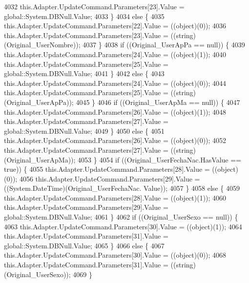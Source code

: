 \begin{DoxyCode}
4032                 this.Adapter.UpdateCommand.Parameters[23].Value = global::System.DBNull.Value;
4033             \}
4034             \textcolor{keywordflow}{else} \{
4035                 this.Adapter.UpdateCommand.Parameters[22].Value = ((object)(0));
4036                 this.Adapter.UpdateCommand.Parameters[23].Value = ((string)(Original\_UserNombre));
4037             \}
4038             \textcolor{keywordflow}{if} ((Original\_UserApPa == null)) \{
4039                 this.Adapter.UpdateCommand.Parameters[24].Value = ((object)(1));
4040                 this.Adapter.UpdateCommand.Parameters[25].Value = global::System.DBNull.Value;
4041             \}
4042             \textcolor{keywordflow}{else} \{
4043                 this.Adapter.UpdateCommand.Parameters[24].Value = ((object)(0));
4044                 this.Adapter.UpdateCommand.Parameters[25].Value = ((string)(Original\_UserApPa));
4045             \}
4046             \textcolor{keywordflow}{if} ((Original\_UserApMa == null)) \{
4047                 this.Adapter.UpdateCommand.Parameters[26].Value = ((object)(1));
4048                 this.Adapter.UpdateCommand.Parameters[27].Value = global::System.DBNull.Value;
4049             \}
4050             \textcolor{keywordflow}{else} \{
4051                 this.Adapter.UpdateCommand.Parameters[26].Value = ((object)(0));
4052                 this.Adapter.UpdateCommand.Parameters[27].Value = ((string)(Original\_UserApMa));
4053             \}
4054             \textcolor{keywordflow}{if} ((Original\_UserFechaNac.HasValue == \textcolor{keyword}{true})) \{
4055                 this.Adapter.UpdateCommand.Parameters[28].Value = ((object)(0));
4056                 this.Adapter.UpdateCommand.Parameters[29].Value = ((System.DateTime)(Original\_UserFechaNac.
      Value));
4057             \}
4058             \textcolor{keywordflow}{else} \{
4059                 this.Adapter.UpdateCommand.Parameters[28].Value = ((object)(1));
4060                 this.Adapter.UpdateCommand.Parameters[29].Value = global::System.DBNull.Value;
4061             \}
4062             \textcolor{keywordflow}{if} ((Original\_UserSexo == null)) \{
4063                 this.Adapter.UpdateCommand.Parameters[30].Value = ((object)(1));
4064                 this.Adapter.UpdateCommand.Parameters[31].Value = global::System.DBNull.Value;
4065             \}
4066             \textcolor{keywordflow}{else} \{
4067                 this.Adapter.UpdateCommand.Parameters[30].Value = ((object)(0));
4068                 this.Adapter.UpdateCommand.Parameters[31].Value = ((string)(Original\_UserSexo));
4069             \}

\end{DoxyCode}
